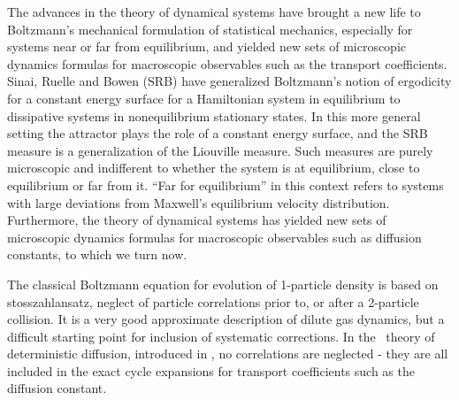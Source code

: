 


The advances in the theory of dynamical systems have brought a new life
to Boltzmann's mechanical formulation of statistical mechanics,
especially for systems near or far from equilibrium, and yielded new sets
of microscopic dynamics formulas for macroscopic observables such as the
transport coefficients. Sinai, Ruelle and Bowen (SRB) have generalized
Boltzmann's notion of ergodicity for a constant energy surface for a
Hamiltonian system in equilibrium to dissipative systems in
{nonequilibrium} stationary states. In this more
general setting the attractor plays the role of a constant energy
surface, and the SRB measure is a generalization of the Liouville
measure. Such measures are purely microscopic and indifferent to whether
the system is at equilibrium, close to equilibrium or far from it. ``Far
for equilibrium'' in this context refers to systems with large deviations
from Maxwell's equilibrium velocity distribution. Furthermore, the theory
of dynamical systems has yielded new sets of microscopic dynamics
formulas for macroscopic observables such as diffusion constants, to
which we turn now.

The classical Boltzmann equation for evolution of 1-particle density is
based on stosszahlansatz, neglect of particle correlations prior to, or
after a 2-particle collision. It is a very good approximate description
of dilute gas dynamics, but a difficult starting point for inclusion of
systematic corrections. In the \po\ theory of deterministic diffusion,
introduced in , no correlations are
neglected - they are all included in the exact cycle expansions for
transport coefficients such as the diffusion constant.

